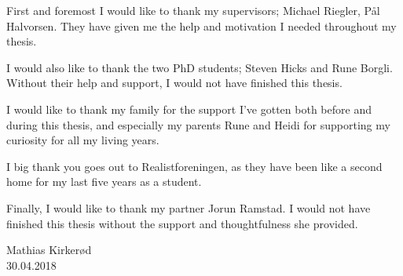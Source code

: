 First and foremost I would like to thank my supervisors; Michael Riegler, Pål Halvorsen. They have given me the help and motivation I needed throughout my thesis.

I would also like to thank the two PhD students; Steven Hicks and Rune Borgli. Without their help and support, I would not have finished this thesis.

I would like to thank my family for the support I've gotten both before and during this thesis, and especially my parents Rune and Heidi for supporting my curiosity for all my living years. 

I big thank you goes out to Realistforeningen, as they have been like a second home for my last five years as a student.

Finally, I would like to thank my partner Jorun Ramstad. I would not have finished this thesis without the support and thoughtfulness she provided.

\vspace{10px}
\noindent
Mathias Kirker{\o}d\\
30.04.2018




